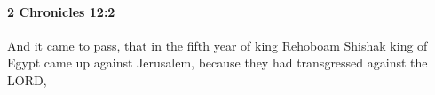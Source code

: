 
		\paragraph{2 Chronicles 12:2} %
			\label{2CHRONICLES-12-2}

			And it came to pass, that in the fifth year of king Rehoboam Shishak king of Egypt came up against Jerusalem, because they had transgressed against the LORD,


